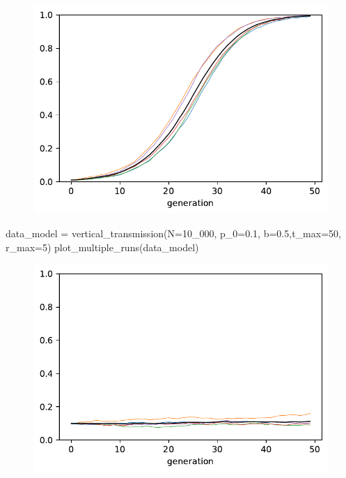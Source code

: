 \documentclass[
  a4paperpaper,
  ,captions=tableheading
]{scrbook}
\newenvironment{Shaded}{\begin{snugshade}}{\end{snugshade}}
\newcommand{\DecValTok}[1]{\textcolor[rgb]{0.68,0.00,0.00}{#1}}
\newcommand{\FloatTok}[1]{\textcolor[rgb]{0.68,0.00,0.00}{#1}}
\newcommand{\NormalTok}[1]{\textcolor[rgb]{0.00,0.23,0.31}{#1}}
\newcommand{\OperatorTok}[1]{\textcolor[rgb]{0.37,0.37,0.37}{#1}}
\begin{document}
\begin{figure}[H]

{\centering \includegraphics{chapter08_files/figure-pdf/cell-5-output-1.pdf}

}

\end{figure}

\begin{Shaded}
\begin{Highlighting}[]
\NormalTok{data\_model }\OperatorTok{=}\NormalTok{ vertical\_transmission(N}\OperatorTok{=}\DecValTok{10\_000}\NormalTok{, p\_0}\OperatorTok{=}\FloatTok{0.1}\NormalTok{, b}\OperatorTok{=}\FloatTok{0.5}\NormalTok{,t\_max}\OperatorTok{=}\DecValTok{50}\NormalTok{, r\_max}\OperatorTok{=}\DecValTok{5}\NormalTok{)}
\NormalTok{plot\_multiple\_runs(data\_model)}
\end{Highlighting}
\end{Shaded}

\begin{figure}[H]

{\centering \includegraphics{chapter08_files/figure-pdf/cell-6-output-1.pdf}

}

\end{figure}
\end{document}
